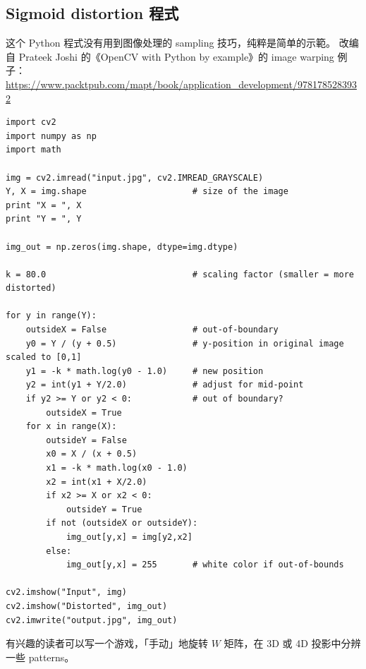 \documentclass[orivec]{llncs}
\begin{document}
\begin{tcolorbox}[colback=lightyellow, breakable, enhanced]
\section*{Sigmoid distortion 程式}

这个 Python 程式没有用到图像处理的 sampling 技巧，纯粹是简单的示範。 改编自 Prateek Joshi 的《OpenCV with Python by example》的 image warping 例子： \\  %
\footnotesize \url{https://www.packtpub.com/mapt/book/application_development/9781785283932}

\footnotesize
\begin{verbatim}
import cv2
import numpy as np
import math

img = cv2.imread("input.jpg", cv2.IMREAD_GRAYSCALE)
Y, X = img.shape                     # size of the image
print "X = ", X
print "Y = ", Y

img_out = np.zeros(img.shape, dtype=img.dtype)

k = 80.0                             # scaling factor (smaller = more distorted)

for y in range(Y):
    outsideX = False                 # out-of-boundary
    y0 = Y / (y + 0.5)               # y-position in original image scaled to [0,1]
    y1 = -k * math.log(y0 - 1.0)     # new position
    y2 = int(y1 + Y/2.0)             # adjust for mid-point
    if y2 >= Y or y2 < 0:            # out of boundary?
        outsideX = True
    for x in range(X):
        outsideY = False
        x0 = X / (x + 0.5)
        x1 = -k * math.log(x0 - 1.0)
        x2 = int(x1 + X/2.0)
        if x2 >= X or x2 < 0:
            outsideY = True
        if not (outsideX or outsideY):
            img_out[y,x] = img[y2,x2]
        else:
            img_out[y,x] = 255       # white color if out-of-bounds

cv2.imshow("Input", img)
cv2.imshow("Distorted", img_out)
cv2.imwrite("output.jpg", img_out)
\end{verbatim}
\normalsize

有兴趣的读者可以写一个游戏，「手动」地旋转 $W$ 矩阵，在 3D 或 4D 投影中分辨一些 patterns。
\end{tcolorbox}
\end{document}
